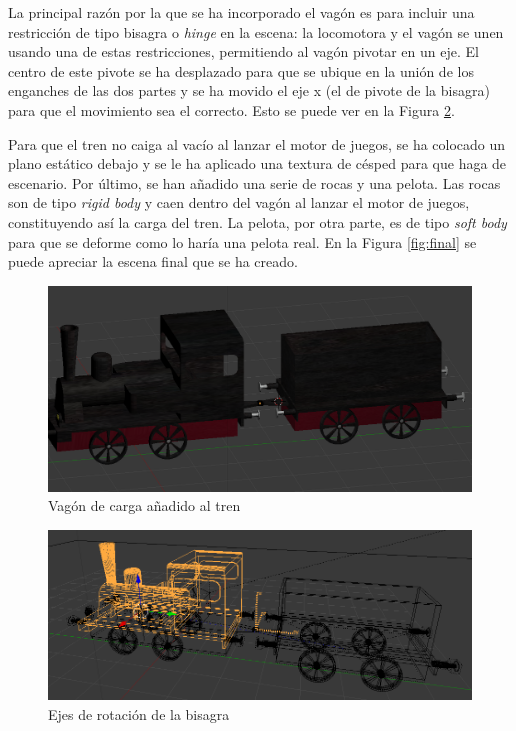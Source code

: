 \documentclass{article}
\begin{document}
La principal razón por la que se ha incorporado el vagón es para incluir una
restricción de tipo bisagra o \textit{hinge} en la escena: la locomotora y el
vagón se unen usando una de estas restricciones, permitiendo al vagón pivotar en
un eje. El centro de este pivote se ha desplazado para que se ubique en la unión
de los enganches de las dos partes y se ha movido el eje x (el de pivote de la
bisagra) para que el movimiento sea el correcto. Esto se puede ver en la Figura
\ref{fig:pivot}.

Para que el tren no caiga al vacío al lanzar el motor de juegos, se ha colocado
un plano estático debajo y se le ha aplicado una textura de césped para que haga
de escenario. Por último, se han añadido una serie de rocas y una pelota. Las
rocas son de tipo \textit{rigid body} y caen dentro del vagón al lanzar el motor
de juegos, constituyendo así la carga del tren. La pelota, por otra parte, es de
tipo \textit{soft body} para que se deforme como lo haría una pelota real. En la
Figura \ref{fig:final} se puede apreciar la escena final que se ha creado.

\begin{figure}
    \centering
    \includegraphics[width=\textwidth]{images/wagon.png}
    \caption{Vagón de carga añadido al tren}
    \label{fig:wagon}
\end{figure}

\begin{figure}
    \centering
    \includegraphics[width=\textwidth]{images/pivot.png}
    \caption{Ejes de rotación de la bisagra}
    \label{fig:pivot}
\end{figure}
\end{document}
